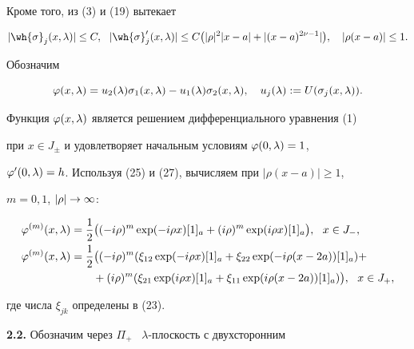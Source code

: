 Кроме того, из (3) и (19) вытекает


\begin{equation}


|\wh{\sigma}_j(x,\la)|\le C,\ \ |\wh{\sigma}'_j (x,\la)|\le C


\big(|\rho|^2|x-a|+|(x-a)^{2\nu-1}|\big),\quad |\rho(x-a)|\le 1.


\end{equation}





Обозначим


\begin{equation}


\vv(x,\la)=u_2(\la)\sigma_1(x,\la)-u_1(\la)\sigma_2(x,\la),


\quad u_j(\la):=U(\sigma_j(x,\la)).


\end{equation}


Функция $\varphi(x,\lambda)$ является решением дифференциального уравнения (1)


при $x\in J_{\pm}$ и удовлетворяет начальным условиям $\varphi(0,\lambda)=1$,


$\varphi'(0,\lambda)=h$. Используя (25) и (27), вычисляем при $|\rho(x-a)|\ge 1$,


$m=0,1$, $|\rho|\to\infty$:


\begin{align}


\vv^{(m)}(x,\la)&=\frac{1}{2}\big((-i\rho)^{m}\exp(-i\rho x)[1]_a


+(i\rho)^{m}\exp(i\rho x)[1]_a\big),\ \ x\in J_{-},\\


%


\vv^{(m)}(x,\la)&=\frac{1}{2}\big((-i\rho)^{m}


(\xi_{12}\exp(-i\rho x)[1]_a+\xi_{22}\exp(-i\rho(x-2a))[1]_a) +\notag \\


%


&\qquad+(i\rho)^{m}(\xi_{21}\exp(i\rho x)[1]_a+


\xi_{11}\exp(i\rho(x-2a))[1]_a)\big),\ \ x\in J_{+},


\end{align}


где числа $\xi_{jk}$ определены в (23).


\medskip





{\bf 2.2. } Обозначим через $\Pi_{+}$ \ $\lambda$-плоскость с двухсторонним


